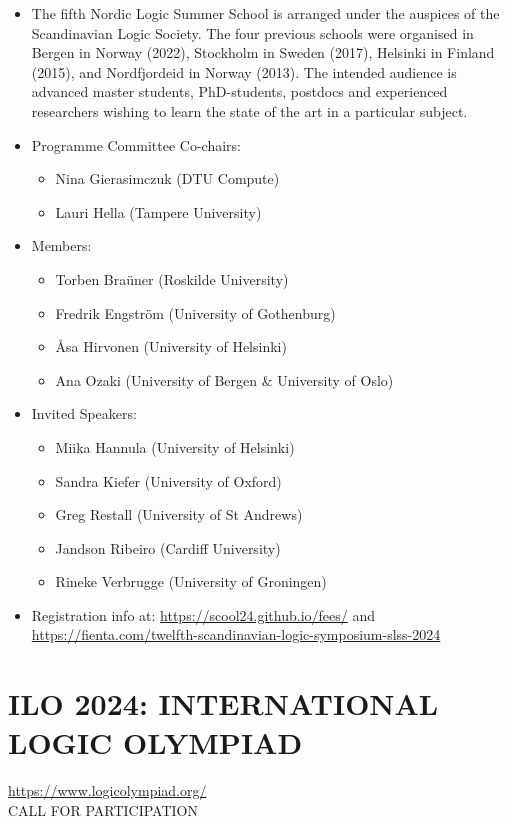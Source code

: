 \documentclass[prodmode,acmtecs]{acmsmall} %
\begin{document}
\begin{itemize}\item  The fifth Nordic Logic Summer School is arranged under the auspices of the Scandinavian Logic Society. The four previous schools were organised in Bergen in Norway (2022), Stockholm in Sweden (2017), Helsinki in Finland (2015), and Nordfjordeid in Norway (2013). The intended audience is advanced master students, PhD-students, postdocs and experienced researchers wishing to learn the state of the art in a particular subject. 
 
\item  Programme Committee Co-chairs: 
 
\begin{itemize}\item  Nina Gierasimczuk (DTU Compute) 
\item  Lauri Hella (Tampere University)
\end{itemize} 
\item  Members: 
 
\begin{itemize}\item  Torben Braüner (Roskilde University) 
\item  Fredrik Engström (University of Gothenburg) 
\item  Åsa Hirvonen (University of Helsinki) 
\item  Ana Ozaki (University of Bergen \& University of Oslo)
\end{itemize} 
\item  Invited Speakers:  
 
\begin{itemize}\item  Miika Hannula (University of Helsinki)
\item  Sandra Kiefer (University of Oxford) 
\item  Greg Restall (University of St Andrews)
\item  Jandson Ribeiro (Cardiff University)
\item  Rineke Verbrugge (University of Groningen)
\end{itemize} 
\item  Registration info at: \href{https://scool24.github.io/fees/}{https://scool24.github.io/fees/} and \href{https://fienta.com/twelfth-scandinavian-logic-symposium-slss-2024}{https://fienta.com/twelfth-scandinavian-logic-symposium-slss-2024} 
 
\end{itemize}\section{ILO 2024: INTERNATIONAL LOGIC OLYMPIAD}\label{ILO2024}   \href{https://www.logicolympiad.org/}{https://www.logicolympiad.org/}\\ 
CALL FOR PARTICIPATION 
\end{document}
